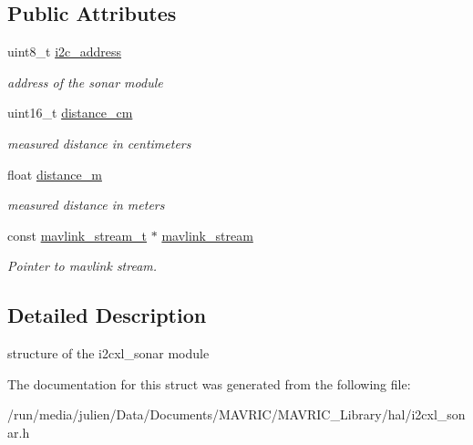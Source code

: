 \subsection*{Public Attributes}
\begin{DoxyCompactItemize}
\item 
\hypertarget{structi2cxl__sonar__t_aa88a0f5e6f6059c738c2d5b0d8bdfeb5}{uint8\+\_\+t \hyperlink{structi2cxl__sonar__t_aa88a0f5e6f6059c738c2d5b0d8bdfeb5}{i2c\+\_\+address}}\label{structi2cxl__sonar__t_aa88a0f5e6f6059c738c2d5b0d8bdfeb5}

\begin{DoxyCompactList}\small\item\em address of the sonar module \end{DoxyCompactList}\item 
\hypertarget{structi2cxl__sonar__t_a766604b4bcd00d9e88d8073ae7b0e188}{uint16\+\_\+t \hyperlink{structi2cxl__sonar__t_a766604b4bcd00d9e88d8073ae7b0e188}{distance\+\_\+cm}}\label{structi2cxl__sonar__t_a766604b4bcd00d9e88d8073ae7b0e188}

\begin{DoxyCompactList}\small\item\em measured distance in centimeters \end{DoxyCompactList}\item 
\hypertarget{structi2cxl__sonar__t_a85c7f1ff84036c3d4730025b5711690d}{float \hyperlink{structi2cxl__sonar__t_a85c7f1ff84036c3d4730025b5711690d}{distance\+\_\+m}}\label{structi2cxl__sonar__t_a85c7f1ff84036c3d4730025b5711690d}

\begin{DoxyCompactList}\small\item\em measured distance in meters \end{DoxyCompactList}\item 
\hypertarget{structi2cxl__sonar__t_abc64816ddb93f98ec730d2c1c7414a64}{const \hyperlink{structmavlink__stream__t}{mavlink\+\_\+stream\+\_\+t} $\ast$ \hyperlink{structi2cxl__sonar__t_abc64816ddb93f98ec730d2c1c7414a64}{mavlink\+\_\+stream}}\label{structi2cxl__sonar__t_abc64816ddb93f98ec730d2c1c7414a64}

\begin{DoxyCompactList}\small\item\em Pointer to mavlink stream. \end{DoxyCompactList}\end{DoxyCompactItemize}


\subsection{Detailed Description}
structure of the i2cxl\+\_\+sonar module 

The documentation for this struct was generated from the following file\+:\begin{DoxyCompactItemize}
\item 
/run/media/julien/\+Data/\+Documents/\+M\+A\+V\+R\+I\+C/\+M\+A\+V\+R\+I\+C\+\_\+\+Library/hal/i2cxl\+\_\+sonar.\+h\end{DoxyCompactItemize}
